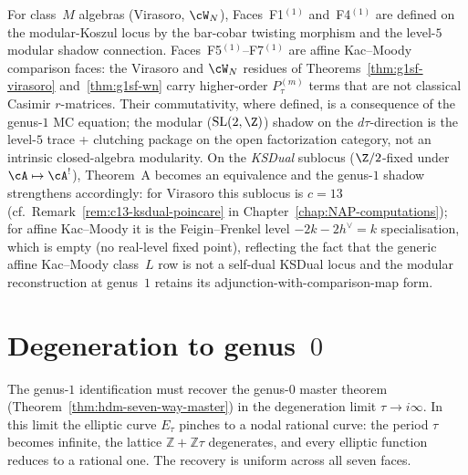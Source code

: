 \begin{remark}
\label{rem:g1sf-class-m-scope}
For class~$M$ algebras (Virasoro, $\cW_N$), Faces~F1$^{(1)}$
and~F4$^{(1)}$ are defined on the modular-Koszul locus by the
bar-cobar twisting morphism and the level-$5$ modular shadow
connection. Faces~F5$^{(1)}$--F7$^{(1)}$ are affine Kac--Moody
comparison faces: the Virasoro and $\cW_N$ residues of
Theorems~\ref{thm:g1sf-virasoro} and~\ref{thm:g1sf-wn} carry
higher-order $P_\tau^{(m)}$ terms that are not classical Casimir
$r$-matrices. Their commutativity, where defined, is a consequence of
the genus-$1$ MC equation; the modular ($\mathrm{SL}(2,\Z)$) shadow on
the $d\tau$-direction is the level-$5$ trace + clutching package on
the open factorization category, not an intrinsic closed-algebra
modularity. On the \emph{KSDual} sublocus
($\Z/2$-fixed under $\cA\mapsto\cA^!$), Theorem~A becomes an
equivalence and the genus-$1$ shadow strengthens accordingly: for
Virasoro this sublocus is $c=13$
(cf.~Remark~\ref{rem:c13-ksdual-poincare} in
Chapter~\ref{chap:NAP-computations}); for affine Kac--Moody it is the
Feigin--Frenkel level $-2k-2h^\vee = k$ specialisation, which is
empty (no real-level fixed point), reflecting the fact that the
generic affine Kac--Moody class~$L$ row is not a self-dual KSDual
locus and the modular reconstruction at genus~$1$ retains its
adjunction-with-comparison-map form.
\end{remark}



\section{Degeneration to genus~$0$}
\label{sec:g1sf-degeneration}

The genus-$1$ identification must recover the genus-$0$ master theorem
(Theorem~\ref{thm:hdm-seven-way-master}) in the degeneration limit
$\tau \to i\infty$. In this limit the elliptic curve $E_\tau$
pinches to a nodal rational curve: the period $\tau$ becomes infinite,
the lattice $\mathbb{Z} + \mathbb{Z}\tau$ degenerates, and every
elliptic function reduces to a rational one. The recovery is uniform
across all seven faces.

